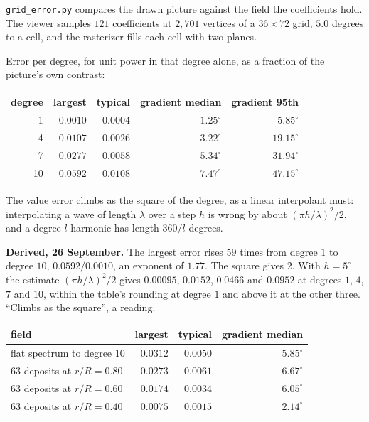 \texttt{grid\_error.py} compares the drawn picture against the field the coefficients hold. The viewer samples \(121\) coefficients at \(2{,}701\) vertices of a \(36 \times 72\) grid, \(5.0\) degrees to a cell, and the rasterizer fills each cell with two planes.

Error per degree, for unit power in that degree alone, as a fraction of the picture's own contrast:

\begin{center}
\begin{tabular}{@{}rrrrr@{}}
\toprule
degree & largest & typical & gradient median & gradient 95th \\
\midrule
1 & \(0.0010\) & \(0.0004\) & \(1.25^\circ\) & \(5.85^\circ\) \\
4 & \(0.0107\) & \(0.0026\) & \(3.22^\circ\) & \(19.15^\circ\) \\
7 & \(0.0277\) & \(0.0058\) & \(5.34^\circ\) & \(31.94^\circ\) \\
10 & \(0.0592\) & \(0.0108\) & \(7.47^\circ\) & \(47.15^\circ\) \\
\bottomrule
\end{tabular}
\end{center}

The value error climbs as the square of the degree, as a linear interpolant must: interpolating a wave of length \(\lambda\) over a step \(h\) is wrong by about \((\pi h/\lambda)^2/2\), and a degree \(l\) harmonic has length \(360/l\) degrees.

\textbf{Derived, 26 September.} The largest error rises \(59\) times from degree \(1\) to degree \(10\), \(0.0592 / 0.0010\), an exponent of \(1.77\). The square gives \(2\). With \(h = 5^\circ\) the estimate \((\pi h/\lambda)^2/2\) gives \(0.00095\), \(0.0152\), \(0.0466\) and \(0.0952\) at degrees \(1\), \(4\), \(7\) and \(10\), within the table's rounding at degree \(1\) and above it at the other three. ``Climbs as the square'', a reading.

\begin{center}
\begin{tabular}{@{}lrrr@{}}
\toprule
field & largest & typical & gradient median \\
\midrule
flat spectrum to degree 10 & \(0.0312\) & \(0.0050\) & \(5.85^\circ\) \\
63 deposits at \(r/R = 0.80\) & \(0.0273\) & \(0.0061\) & \(6.67^\circ\) \\
63 deposits at \(r/R = 0.60\) & \(0.0174\) & \(0.0034\) & \(6.05^\circ\) \\
63 deposits at \(r/R = 0.40\) & \(0.0075\) & \(0.0015\) & \(2.14^\circ\) \\
\bottomrule
\end{tabular}
\end{center}

